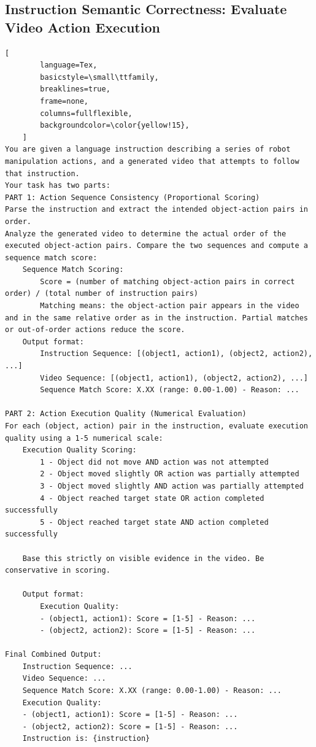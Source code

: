 \centering

\begin{tcolorbox}[
    promptstyle, 
    width=\linewidth, 
    breakable
] 
    \subsection*{Instruction Semantic Correctness: Evaluate Video Action Execution}

    \begin{lstlisting}[
        language=Tex, 
        basicstyle=\small\ttfamily,
        breaklines=true,
        frame=none, 
        columns=fullflexible,
        backgroundcolor=\color{yellow!15}, 
    ]
You are given a language instruction describing a series of robot manipulation actions, and a generated video that attempts to follow that instruction.
Your task has two parts:
PART 1: Action Sequence Consistency (Proportional Scoring)
Parse the instruction and extract the intended object-action pairs in order.
Analyze the generated video to determine the actual order of the executed object-action pairs. Compare the two sequences and compute a sequence match score:
    Sequence Match Scoring: 
        Score = (number of matching object-action pairs in correct order) / (total number of instruction pairs)
        Matching means: the object-action pair appears in the video and in the same relative order as in the instruction. Partial matches or out-of-order actions reduce the score.
    Output format:
        Instruction Sequence: [(object1, action1), (object2, action2), ...]
        Video Sequence: [(object1, action1), (object2, action2), ...]
        Sequence Match Score: X.XX (range: 0.00-1.00) - Reason: ...
        
PART 2: Action Execution Quality (Numerical Evaluation)
For each (object, action) pair in the instruction, evaluate execution quality using a 1-5 numerical scale:
    Execution Quality Scoring:
        1 - Object did not move AND action was not attempted
        2 - Object moved slightly OR action was partially attempted
        3 - Object moved slightly AND action was partially attempted
        4 - Object reached target state OR action completed successfully
        5 - Object reached target state AND action completed successfully

    Base this strictly on visible evidence in the video. Be conservative in scoring.

    Output format:
        Execution Quality:
        - (object1, action1): Score = [1-5] - Reason: ...
        - (object2, action2): Score = [1-5] - Reason: ...
        
Final Combined Output:
    Instruction Sequence: ...
    Video Sequence: ...
    Sequence Match Score: X.XX (range: 0.00-1.00) - Reason: ...
    Execution Quality:
    - (object1, action1): Score = [1-5] - Reason: ...
    - (object2, action2): Score = [1-5] - Reason: ...
    Instruction is: {instruction}

    \end{lstlisting}
    
\end{tcolorbox}


